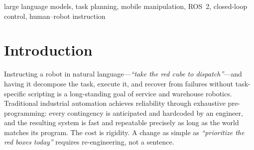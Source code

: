 \documentclass[conference]{IEEEtran}
\begin{document}
\begin{abstract}
We present a reproducible closed-loop large language model (LLM) task
planner for a mobile manipulator, built on an open-source stack (ROS~2,
Gazebo, Nav2, MoveIt~2). The LLM receives a natural-language command and a
structured scene state and acts only by calling typed robot tool services;
a fresh scene state after every action closes the perception--action loop
and enables autonomous replanning after execution failures. We compare this
planner against a hardcoded baseline that runs the same task through the
same tool server and grasp implementation with a fixed, perception-blind
sequence and no recovery.
Single-object pick-and-deliver is reported complete in 13/16 trials, most
of them involving an autonomous recovery from a failed first grasp. Outcomes
were self-reported rather than checked against the simulator, and four of
those runs end with a failed or timed-out place, so the true rate lies
between 9/16 and 13/16. The baseline is faster and repeatable on its tuned
configuration but cannot adapt, and LLM reliability degrades on
multi-object and ambiguous commands.
We report all outcomes, including residual failure modes, and distill
integration lessons for practitioners building similar systems.
\end{abstract}

\begin{IEEEkeywords}
large language models, task planning, mobile manipulation, ROS~2,
closed-loop control, human--robot instruction
\end{IEEEkeywords}

\section{Introduction}

Instructing a robot in natural language---\emph{``take the red cube to
dispatch''}---and having it decompose the task, execute it, and recover
from failures without task-specific scripting is a long-standing goal of
service and warehouse robotics. Traditional industrial automation achieves
reliability through exhaustive pre-programming: every contingency is
anticipated and hardcoded by an engineer, and the resulting system is fast
and repeatable precisely as long as the world matches its program. The cost
is rigidity. A change as simple as \emph{``prioritize the red boxes
today''} requires re-engineering, not a sentence.
\end{document}

